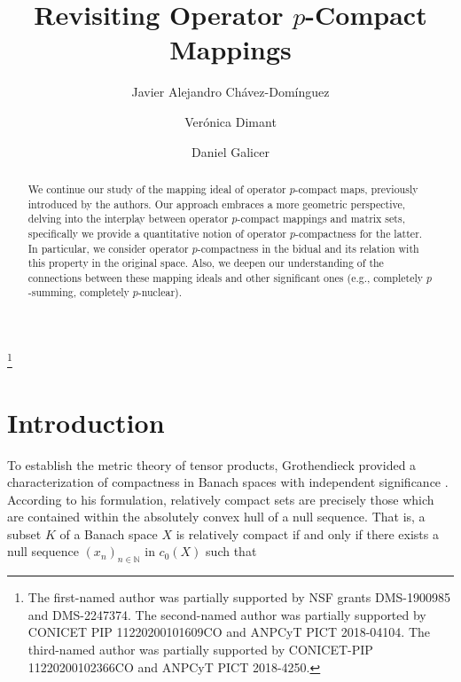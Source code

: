 \documentclass[11pt]{amsart}
\numberwithin{equation}{section}
\begin{document}
\title{Revisiting Operator $p$-Compact Mappings}

\author[J.A. Ch\'avez-Dom\'inguez]{Javier Alejandro Ch\'avez-Dom\'inguez}
\address{Department of Mathematics, University of Oklahoma, Norman, OK 73019-3103,
USA} 

\author[V. Dimant]{Ver\'onica Dimant}
\address{Departamento de Matem\'{a}tica y Ciencias, Universidad de San
Andr\'{e}s, Vito Dumas 284, (B1644BID) Victoria, Buenos Aires,
Argentina and CONICET} 

\author[D. Galicer]{Daniel Galicer}
\address{Departamento de Matem\'{a}ticas y Estad\'{\i}stica, Universidad T. Di Tella, Av. Figueroa Alcorta 7350 (1428), Buenos Aires, Argentina and CONICET.
On leave from Departamento de Matem\'{a}tica, Facultad de Ciencias Exactas y Naturales, Universidad de Buenos Aires, (1428) Buenos Aires,
Argentina} 
\date{}

\thanks{The first-named author was partially supported by NSF grants DMS-1900985 and DMS-2247374. The second-named author was partially supported by CONICET PIP 11220200101609CO and ANPCyT PICT 2018-04104. The third-named author was partially supported by CONICET-PIP 11220200102366CO
 and ANPCyT PICT 2018-4250.}

\begin{abstract}
We continue our study of the mapping ideal of operator $p$-compact maps, previously introduced by the authors. Our approach embraces a more geometric perspective, delving into the interplay between operator $p$-compact mappings and matrix sets, specifically we provide a quantitative notion of operator $p$-compactness for the latter.
In particular, we consider operator $p$-compactness in the bidual and its relation with this property in the original space.
Also, we deepen our understanding of the connections between these mapping ideals and other significant ones (e.g., completely $p$-summing, completely $p$-nuclear).
\end{abstract}


\maketitle


\section{Introduction}

To establish the metric theory of tensor products, Grothendieck provided a characterization of compactness in Banach spaces with independent significance \cite[Chap. I, p. 112]{grothendieck1955produits}. According to his formulation, relatively compact sets are precisely those which are contained within the absolutely convex hull of a null sequence. That is, a subset \(K\) of a Banach space \(X\) is relatively compact if and only if there exists a null sequence \((x_n)_{n \in \mathbb{N}}\) in $c_0(X)$ such that
\end{document}
